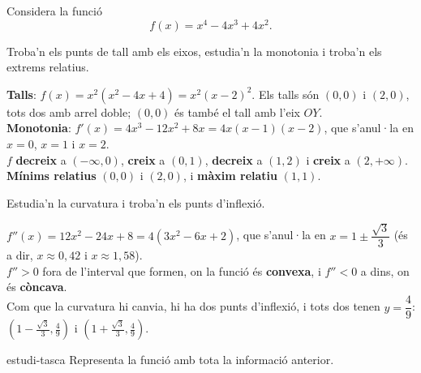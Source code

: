 Considera la funció
\[
f(x)=x^4-4x^3+4x^2 .
\]

\begin{apartats}

Troba'n els punts de tall amb els eixos, estudia'n la monotonia i troba'n els extrems
relatius.

\begin{solucio}
\textbf{Talls}: $f(x)=x^2\left(x^2-4x+4\right)=x^2(x-2)^2$. Els talls són $(0,0)$ i $(2,0)$, tots dos
amb arrel doble; $(0,0)$ és també el tall amb l'eix $OY$.\\
\textbf{Monotonia}: $f'(x)=4x^3-12x^2+8x=4x(x-1)(x-2)$, que s'anul·la en $x=0$, $x=1$ i $x=2$.\\
$f$ \textbf{decreix} a $(-\infty,0)$, \textbf{creix} a $(0,1)$, \textbf{decreix} a $(1,2)$ i
\textbf{creix} a $(2,+\infty)$.\\
\textbf{Mínims relatius} $(0,0)$ i $(2,0)$, i \textbf{màxim relatiu} $(1,1)$.
\end{solucio}

\begin{nomesllarg}
Estudia'n la curvatura i troba'n els punts d'inflexió.

\begin{solucio}
$f''(x)=12x^2-24x+8=4\left(3x^2-6x+2\right)$, que s'anul·la en $x=1\pm\dfrac{\sqrt3}{3}$ (és a dir,
$x\approx0{,}42$ i $x\approx1{,}58$).\\
$f''>0$ fora de l'interval que formen, on la funció és \textbf{convexa}, i $f''<0$ a dins, on és
\textbf{còncava}.\\
Com que la curvatura hi canvia, hi ha dos punts d'inflexió, i tots dos tenen $y=\dfrac49$:
$\left(1-\tfrac{\sqrt3}{3},\tfrac49\right)$ i $\left(1+\tfrac{\sqrt3}{3},\tfrac49\right)$.
\end{solucio}
\end{nomesllarg}

\begin{tria}{estudi-tasca}
Representa la funció amb tota la informació anterior.


\end{tria}
\end{apartats}
